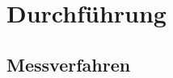 \chapter{Durchführung} \label{ch:Durchfuehrung}

\section{Messverfahren}
\label{sec:Messverfahren}

